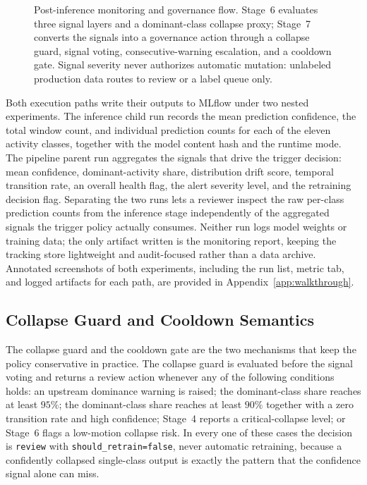 \begin{figure}[htbp]
\caption[Post-inference monitoring and governance flow]{Post-inference monitoring and governance
flow. Stage~6 evaluates three signal layers and a dominant-class collapse proxy; Stage~7
converts the signals into a governance action through a collapse guard, signal voting,
consecutive-warning escalation, and a cooldown gate. Signal severity never authorizes automatic
mutation: unlabeled production data routes to review or a label queue only.}
\label{fig:monitoring_governance_flow}
\end{figure}
\FloatBarrier

Both execution paths write their outputs to MLflow under two nested experiments. The inference
child run records the mean prediction confidence, the total window count, and individual
prediction counts for each of the eleven activity classes, together with the model content hash
and the runtime mode. The pipeline parent run aggregates the signals that drive the trigger
decision: mean confidence, dominant-activity share, distribution drift score, temporal transition
rate, an overall health flag, the alert severity level, and the retraining decision flag.
Separating the two runs lets a reviewer inspect the raw per-class prediction counts from the
inference stage independently of the aggregated signals the trigger policy actually consumes.
Neither run logs model weights or training data; the only artifact written is the monitoring
report, keeping the tracking store lightweight and audit-focused rather than a data archive.
Annotated screenshots of both experiments, including the run list, metric tab, and logged
artifacts for each path, are provided in Appendix~\ref{app:walkthrough}.

\subsection{Collapse Guard and Cooldown Semantics}
\label{sec:collapse_cooldown}

The collapse guard and the cooldown gate are the two mechanisms that keep the policy conservative in practice. The collapse guard is evaluated before the signal voting and returns a review action whenever any of the following conditions holds: an upstream dominance warning is raised; the dominant-class share reaches at least \(95\%\); the dominant-class share reaches at least \(90\%\) together with a zero transition rate and high confidence; Stage~4 reports a critical-collapse level; or Stage~6 flags a low-motion collapse risk. In every one of these cases the decision is \texttt{review} with \texttt{should\_retrain=false}, never automatic retraining, because a confidently collapsed single-class output is exactly the pattern that the confidence signal alone can miss.

